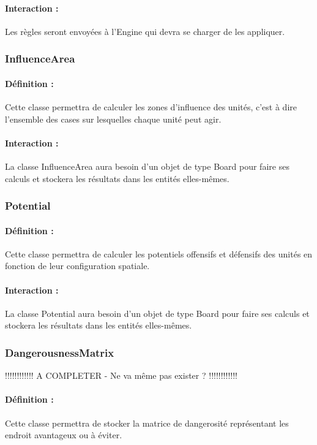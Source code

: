 \documentclass[12pt]{article}
\begin{document}
				\paragraph{Interaction :}
				Les règles seront envoyées à l'Engine qui devra se charger de les appliquer.

			\subsubsection{InfluenceArea}

				\paragraph{Définition :}
				Cette classe permettra de calculer les zones d'influence des unités, c'est à dire l'ensemble des cases sur lesquelles 
				chaque unité peut agir.
				\paragraph{Interaction :}
				La classe InfluenceArea aura besoin d'un objet de type Board pour faire ses calculs et stockera les résultats dans 
				les entités elles-mêmes.

			\subsubsection{Potential}

				\paragraph{Définition :}
				Cette classe permettra de calculer les potentiels offensifs et défensifs des unités en fonction de leur configuration spatiale.
				\paragraph{Interaction :}
				La classe Potential aura besoin d'un objet de type Board pour faire ses calculs et stockera les résultats dans les 
				entités elles-mêmes.

			\subsubsection{DangerousnessMatrix}

				!!!!!!!!!!!! A COMPLETER - Ne va même pas exister ? !!!!!!!!!!!!
				\paragraph{Définition :}
				Cette classe permettra de stocker la matrice de dangerosité représentant les endroit avantageux ou à éviter.
\end{document}
